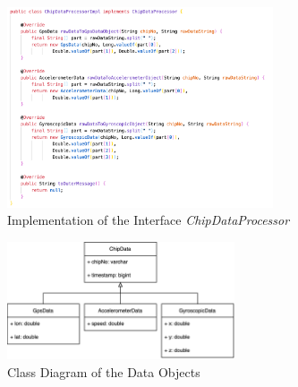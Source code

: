 \documentclass[technote, transmag, onecolumn, 9pt]{IEEEtran}
\begin{document}
\begin{figure}[!htp]
	\centering
	\includegraphics[width=0.7\textwidth]{./img/f18-intf-impl.png}
	\caption{Implementation of the Interface \textit{ChipDataProcessor}}
	\label{fig:intf-impl}
\end{figure}

\begin{figure}[!htp]
	\centering
	\includegraphics[width=0.6\textwidth]{./img/f17-class-diagram.png}
	\caption{Class Diagram of the Data Objects}
	\label{fig:class-diagram}
\end{figure}
\end{document}
